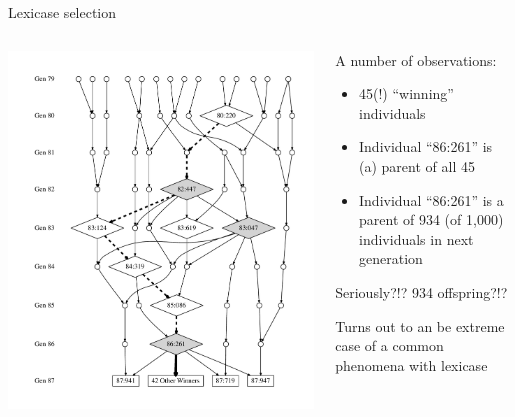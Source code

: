 \documentclass{beamer}
\newcommand{\linespace}{\vskip 0.25cm}
\begin{document}
\begin{frame}{Lexicase selection}
	\begin{columns}
		\begin{column}{0.5 \linewidth}
			\includegraphics[height=0.9\textheight]{Figures/ancestors_of_winners_colons}
		\end{column}
		\begin{column}{0.45 \linewidth}
			\begin{overprint}
			A number of observations:
			\begin{itemize}
				\item 45(!) ``winning'' individuals
				\item Individual ``86:261'' is (a) parent of all 45
				\item Individual ``86:261'' is a parent of 934 (of 1,000) individuals in next generation
			\end{itemize}
			
			Seriously?!? 934 offspring?!?
			
			\linespace
			
			Turns out to an be extreme case of a common phenomena with lexicase
			

\end{overprint}
\end{column}
\end{columns}
\end{frame}
\end{document}
